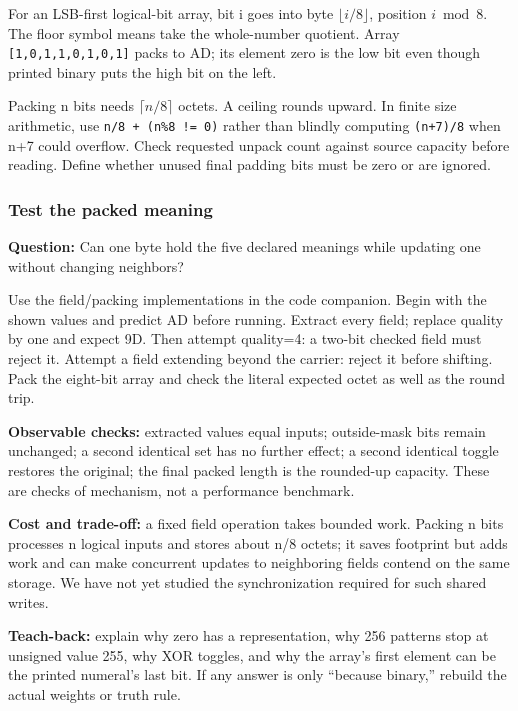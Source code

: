 For an LSB-first logical-bit array, bit i goes into byte \(\lfloor i/8\rfloor\), position \(i\bmod8\). The floor symbol means take the whole-number quotient. Array \texttt{{[}1,0,1,1,0,1,0,1{]}} packs to AD; its element zero is the low bit even though printed binary puts the high bit on the left.

Packing n bits needs \(\lceil n/8\rceil\) octets. A ceiling rounds upward. In finite size arithmetic, use \texttt{n/8\ +\ (n\%8\ !=\ 0)} rather than blindly computing \texttt{(n+7)/8} when n+7 could overflow. Check requested unpack count against source capacity before reading. Define whether unused final padding bits must be zero or are ignored.

\subsubsection{Test the packed meaning}\label{05-engine-i-ch001-test-the-packed-meaning}

\textbf{Question:} Can one byte hold the five declared meanings while updating one without changing neighbors?

Use the field/packing implementations in the code companion. Begin with the shown values and predict AD before running. Extract every field; replace quality by one and expect 9D. Then attempt quality=4: a two-bit checked field must reject it. Attempt a field extending beyond the carrier: reject it before shifting. Pack the eight-bit array and check the literal expected octet as well as the round trip.

\textbf{Observable checks:} extracted values equal inputs; outside-mask bits remain unchanged; a second identical set has no further effect; a second identical toggle restores the original; the final packed length is the rounded-up capacity. These are checks of mechanism, not a performance benchmark.

\textbf{Cost and trade-off:} a fixed field operation takes bounded work. Packing n bits processes n logical inputs and stores about n/8 octets; it saves footprint but adds work and can make concurrent updates to neighboring fields contend on the same storage. We have not yet studied the synchronization required for such shared writes.

\textbf{Teach-back:} explain why zero has a representation, why 256 patterns stop at unsigned value 255, why XOR toggles, and why the array's first element can be the printed numeral's last bit. If any answer is only ``because binary,'' rebuild the actual weights or truth rule.

